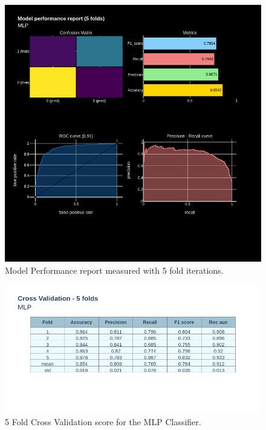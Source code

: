 \documentclass[12pt]{article}
\begin{document}
\begin{figure}[ht]
\centering
\includegraphics[width=1\textwidth]{newplot(43).png}
\caption{Model Performance report measured with 5 fold iterations.}
\end{figure}

\begin{figure}[ht]
\centering
\includegraphics[width=1\textwidth]{newplot(44).png}
\caption{5 Fold Cross Validation score for the MLP Classifier.}
\end{figure}
\end{document}
